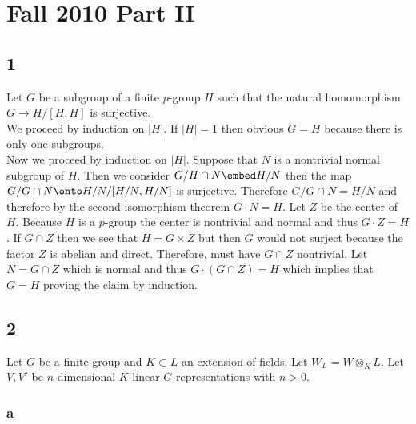 \documentclass[12pt]{article}
\begin{document}
\section{Fall 2010 Part II}

\subsection{1}

Let $G$ be a subgroup of a finite $p$-group $H$ such that the natural homomorphism $G \to H / [H, H]$ is surjective. 
\bigskip\\
We proceed by induction on $|H|$. If $|H| = 1$ then obvious $G = H$ because there is only one subgroups. 
\bigskip\\
Now we proceed by induction on $|H|$. Suppose that $N$ is a nontrivial normal subgroup of $H$. Then we consider $G/H \cap N \embed H / N$ then the map $G/G \cap N \onto H/N/[H/N, H/N]$ is surjective. Therefore $G/G \cap N = H/N$ and therefore by the second isomorphism theorem $G \cdot N = H$. Let $Z$ be the center of $H$. Because $H$ is a $p$-group the center is nontrivial and normal and thus $G \cdot Z = H$. If $G \cap Z$ then we see that $H = G \times Z$ but then $G$ would not surject because the factor $Z$ is abelian and direct. Therefore, must have $G \cap Z$ nontrivial. Let $N = G \cap Z$ which is normal and thus $G \cdot (G \cap Z) = H$ which implies that $G = H$ proving the claim by induction. 

\subsection{2}

Let $G$ be a finite group and $K \subset L$ an extension of fields. Let $W_L = W \otimes_K L$. Let $V, V'$ be $n$-dimensional $K$-linear $G$-representations with $n > 0$.

\subsubsection{a}
\end{document}
